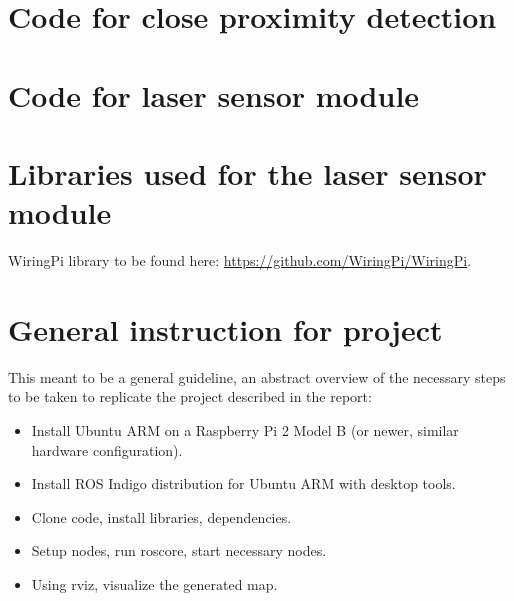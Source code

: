 \section{Code for close proximity detection}\label{code:proximity-full}


\clearpage

\section{Code for laser sensor module}\label{code:laser-full}


\clearpage

\section{Libraries used for the laser sensor module}\label{code:laser-libs}

\clearpage


WiringPi library to be found here: \url{https://github.com/WiringPi/WiringPi}.

\clearpage

\section{General instruction for project}

This meant to be a general guideline, an abstract overview of the necessary steps to be taken to replicate the project described in the report:
\begin{itemize}
	\item Install Ubuntu ARM on a Raspberry Pi 2 Model B (or newer, similar hardware configuration).
	\item Install ROS Indigo distribution for Ubuntu ARM with desktop tools.
	\item Clone code, install libraries, dependencies.
	\item Setup nodes, run roscore, start necessary nodes.
	\item Using rviz, visualize the generated map.
\end{itemize}


